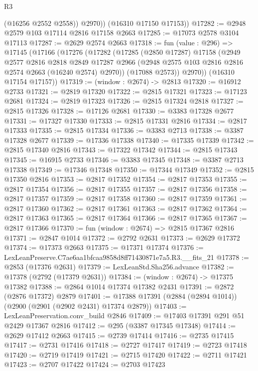 \begin{lexlean}{R3}
\begin{coremodule}
            (@16256 @2552 @2558))
          @2970))
      (@16310 @17150 @17153))
@17282 := @2948 @2579 @103 @17114 @2816 @17158 @2663
@17285 := @17073 @2578 @3104 @17113
@17287 := @2629 @2574 @2663
@17318 := fun (value : @296) =>
  @17145
    (@17166
      (@17276
        (@17282
          (@17285
            (@2850 @17287)
            @17158
            (@2949
              @2577
              @2816
              @2818
              @2849
              @17287
              @2966
              (@2948 @2575 @103 @2816 @2816 @2574 @2663 (@16240 @2574) @2970))
            (@17088 @2573))
          @2970))
      (@16310 @17154 @17157))
@17319 := (window : @2674) -> @2813
@17320 := @16912 @2733
@17321 := @2819 @17320
@17322 := @2815 @17321
@17323 := @17123 @2681
@17324 := @2819 @17323
@17326 := @2815 @17324 @2818
@17327 := @2815 @17326
@17328 := @17126 @2681
@17330 := @3383 @17328 @2677
@17331 := @17327 @17330
@17333 := @2815 @17331 @2816
@17334 := @2817 @17333
@17335 := @2815 @17334
@17336 := @3383 @2713
@17338 := @3387 @17328 @2677
@17339 := @17336 @17338
@17340 := @17335 @17339
@17342 := @2815 @17340 @2816
@17343 := @17322 @17342
@17344 := @2815 @17343
@17345 := @16915 @2733
@17346 := @3383 @17345
@17348 := @3387 @2713 @17338
@17349 := @17346 @17348
@17350 := @17344 @17349
@17352 := @2815 @17350 @2816
@17353 := @2817 @17352
@17354 := @2817 @17353
@17355 := @2817 @17354
@17356 := @2817 @17355
@17357 := @2817 @17356
@17358 := @2817 @17357
@17359 := @2817 @17358
@17360 := @2817 @17359
@17361 := @2817 @17360
@17362 := @2817 @17361
@17363 := @2817 @17362
@17364 := @2817 @17363
@17365 := @2817 @17364
@17366 := @2817 @17365
@17367 := @2817 @17366
@17370 := fun (window : @2674) => @2815 @17367 @2816
@17371 := @2847 @1014
@17372 := @2792 @2631
@17373 := @2629 @17372
@17374 := @17373 @2663
@17375 := @17371 @17374
@17376 := LexLeanPreserve.C7ae6aa1bfcaa9858d8ff71430871e7a5.R3.__fits_21
@17378 := @2853 (@17376 @2631)
@17379 := LexLeanStd.Sha256.advance
@17382 := @17378 (@2792 (@17379 @2631))
@17384 := (window : @2674) -> @17375 @17382
@17388 := @2864 @1014 @17374 @17382 @2431
@17391 := @2872 (@2876 @17372) @2879
@17401 := @17388 @17391 (@2884 (@2894 @1014)) (@2900 (@2901 (@2902 @2431) @17374 @2879))
@17403 := LexLeanPreservation.conv_build @2846
@17409 := @17403 @17391 @291 @51 @2429 @17367 @2816
@17412 := @295 (@3387 @17345 @17348)
@17414 := @2629 @17412 @2663
@17415 := @2739 @17414
@17416 := @2735 @17415
@17417 := @2731 @17416
@17418 := @2727 @17417
@17419 := @2723 @17418
@17420 := @2719 @17419
@17421 := @2715 @17420
@17422 := @2711 @17421
@17423 := @2707 @17422
@17424 := @2703 @17423

\end{coremodule}
\end{lexlean}
